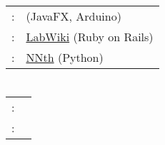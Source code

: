 \documentclass[a4paper,10pt]{article} %
\begin{document}
\section{\researchProjectsSection}

\begin{tabular}{rp{11cm}}

	\interactionAndIHC: &
	\href{https://siimi.medialab.ufg.br/up/777/o/49_cubos_interativos.pdf}
		{\CThreeTitle} (JavaFX, Arduino)\\
	\RNPIntegration: &
	\href{https://github.com/Yuri-M-Dias/LabWiki}{LabWiki} (Ruby on Rails) \\
	\machineLearning: &
	\href{https://gist.github.com/Yuri-M-Dias/d7b69fd8bc873cdf6029af5dcb5a8a0f}
		{NNth} (Python)\\

\end{tabular}


\section{\languagesSection}

\begin{tabular}{rp{11cm}}

	\textsc{\english:} & \englishDescription \\

	\textsc{\french:} & \frenchDescription \\

\end{tabular}
\end{document}
